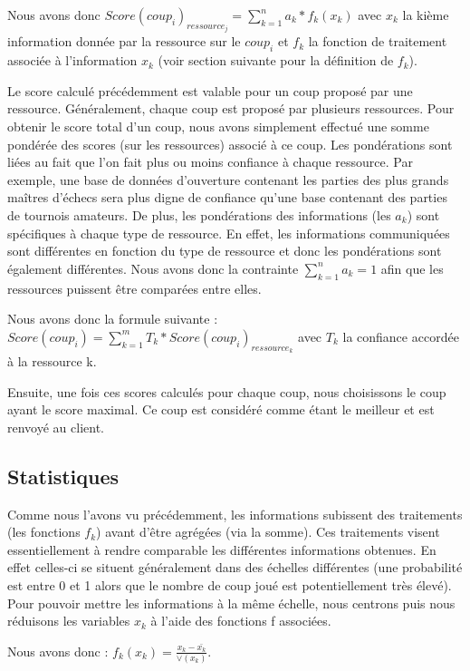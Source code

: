 \documentclass[a4paper,11pt]{article}
\begin{document}
Nous avons donc \(Score(coup_{i})_{ressource_{j}}=\sum_{k=1}^na_{k}*f_{k}(x_{k})\) avec \(x_{k}\) la kième information donnée par la ressource sur le \(coup_{i}\) et \(f_{k}\) la fonction de traitement associée à l'information \(x_{k}\) (voir section suivante pour la définition de \(f_{k}\)).

Le score calculé précédemment est valable pour un coup proposé par une ressource. Généralement, chaque coup est proposé par plusieurs ressources. Pour obtenir le score total d'un coup, nous avons simplement effectué une somme pondérée des scores (sur les ressources) associé à ce coup. Les pondérations sont liées au fait que l'on fait plus ou moins confiance à chaque ressource. Par exemple, une base de données d'ouverture contenant les parties des plus grands maîtres d'échecs sera plus digne de confiance qu'une base contenant des parties de tournois amateurs. De plus, les pondérations des informations (les \(a_{k}\)) sont spécifiques à chaque type de ressource. En effet, les informations communiquées sont différentes en fonction du type de ressource et donc les pondérations sont également différentes. Nous avons donc la contrainte \(\sum_{k=1}^na_{k}=1\) afin que les ressources puissent être comparées entre elles.

Nous avons donc la formule suivante :\\ \(Score(coup_{i})=\sum_{k=1}^mT_{k}*Score(coup_{i})_{ressource_{k}}\) avec \(T_{k}\) la confiance accordée à la ressource k.

Ensuite, une fois ces scores calculés pour chaque coup, nous choisissons le coup ayant le score maximal. Ce coup est considéré comme étant le meilleur et est renvoyé au client.

\subsection{Statistiques}
Comme nous l'avons vu précédemment, les informations subissent des traitements (les fonctions \(f_{k}\)) avant d'être agrégées (via la somme). Ces traitements visent essentiellement à rendre comparable les différentes informations obtenues. En effet celles-ci se situent généralement dans des échelles différentes (une probabilité est entre 0 et 1 alors que le nombre de coup joué est potentiellement très élevé). Pour pouvoir mettre les informations à la même échelle, nous centrons puis nous réduisons les variables \(x_{k}\) à l'aide des fonctions f associées.

Nous avons donc : \(f_{k}(x_{k})=\frac{x_{k}-\bar{x_{k}}}{\vee(x_{k})}\).
\end{document}
